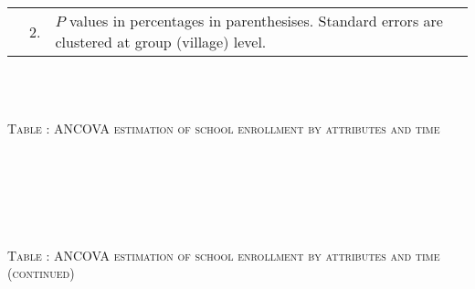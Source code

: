 \begin{minipage}[t]{14cm}
\begin{tabular}{>{\hfill\scriptsize}p{1cm}<{}>{\hfill\scriptsize}p{.25cm}<{}>{\scriptsize}p{12cm}<{\hfill}}
& 2. & $P$ values in percentages in parenthesises. Standard errors are clustered at group (village) level. %
 \end{tabular}
\end{minipage} \\\\\hspace{-1cm}\begin{minipage}[t]{14cm} \hfil\textsc{\normalsize Table \thetable: ANCOVA estimation of school enrollment by attributes and time\label{tab ANCOVA enroll time varying attributes}}\\ \setlength{\tabcolsep}{1pt}
  \setlength{\baselineskip}{8pt}
  \renewcommand{\arraystretch}{.55}
  \hfil{}\\
\renewcommand{\arraystretch}{.8}
\setlength{\tabcolsep}{1pt} \begin{tabular}{>{\hfill\scriptsize}p{1cm}<{}>{\hfill\scriptsize}p{.25cm}<{}>{\scriptsize}p{12cm}<{\hfill}}   \end{tabular}
\end{minipage} \\\\\addtocounter{table}{-1}\hspace{-1cm}\begin{minipage}[t]{14cm} \hfil\textsc{\normalsize Table \thetable: ANCOVA estimation of school enrollment by attributes and time (continued)\label{tab ANCOVA enroll time varying attributes2}}\\ \setlength{\tabcolsep}{1pt}
  \setlength{\baselineskip}{8pt}
  \renewcommand{\arraystretch}{.55}
  \hfil{}\\
\renewcommand{\arraystretch}{.8}
\setlength{\tabcolsep}{1pt} \begin{tabular}{>{\hfill\scriptsize}p{1cm}<{}>{\hfill\scriptsize}p{.25cm}<{}>{\scriptsize}p{12cm}<{\hfill}}   \end{tabular}

\end{minipage}
